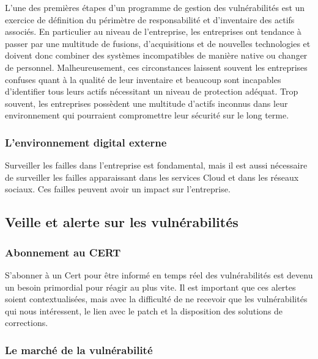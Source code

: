 L'une des premières étapes d'un programme de gestion des vulnérabilités est un exercice de définition du périmètre de responsabilité et d'inventaire des actifs associés. En particulier au niveau de l'entreprise, les entreprises ont tendance à passer par une multitude de fusions, d'acquisitions et de nouvelles technologies et doivent donc combiner des systèmes incompatibles de manière native ou changer de personnel. Malheureusement, ces circonstances laissent souvent les entreprises confuses quant à la qualité de leur inventaire et beaucoup sont incapables d'identifier tous leurs actifs nécessitant un niveau de protection adéquat. Trop souvent, les entreprises possèdent une multitude d'actifs inconnus dans leur environnement qui pourraient compromettre leur sécurité sur le long terme.

\subsubsection{L’environnement digital externe}


Surveiller les failles dans l'entreprise est fondamental, mais il est aussi nécessaire de surveiller les failles apparaissant dans les services Cloud et dans les réseaux sociaux. Ces failles peuvent avoir un impact sur l'entreprise.

\subsection{Veille et alerte sur les vulnérabilités}

\subsubsection{Abonnement au CERT}

S’abonner à un Cert pour être informé en temps réel des vulnérabilités est devenu un besoin primordial pour réagir au plus vite. Il est important que ces alertes soient contextualisées, mais avec la difficulté de ne recevoir que les vulnérabilités qui nous intéressent, le lien avec le patch et la disposition des solutions de corrections.

\subsubsection{Le marché de la vulnérabilité}

